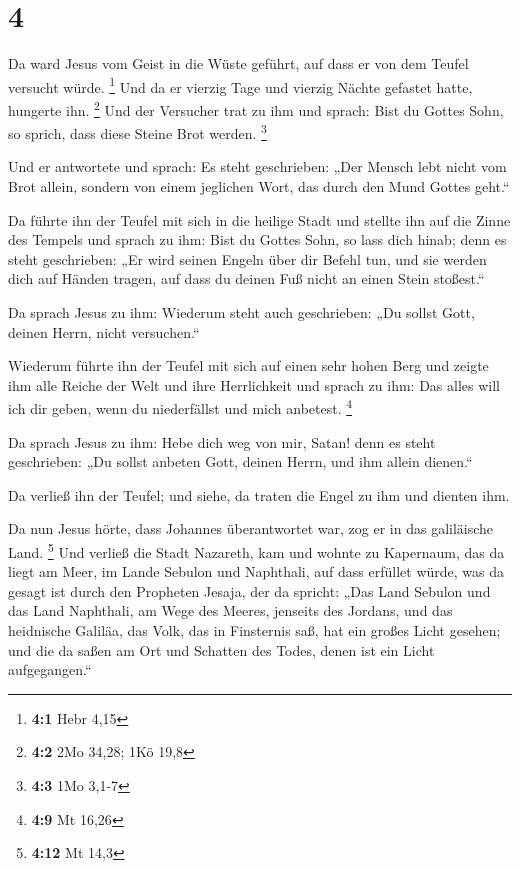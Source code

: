\hypertarget{section-2}{%
\section{4}\label{section-2}}

 Da ward Jesus vom Geist in die Wüste geführt, auf dass er
von dem Teufel versucht würde. \footnote{\textbf{4:1} Hebr 4,15}
 Und da er vierzig Tage und vierzig Nächte gefastet hatte,
hungerte ihn. \footnote{\textbf{4:2} 2Mo 34,28; 1Kö 19,8} 
Und der Versucher trat zu ihm und sprach: Bist du Gottes Sohn, so
sprich, dass diese Steine Brot werden. \footnote{\textbf{4:3} 1Mo 3,1-7}

 Und er antwortete und sprach: Es steht geschrieben: „Der
Mensch lebt nicht vom Brot allein, sondern von einem jeglichen Wort, das
durch den Mund Gottes geht.``

 Da führte ihn der Teufel mit sich in die heilige Stadt und
stellte ihn auf die Zinne des Tempels  und sprach zu ihm:
Bist du Gottes Sohn, so lass dich hinab; denn es steht geschrieben: „Er
wird seinen Engeln über dir Befehl tun, und sie werden dich auf Händen
tragen, auf dass du deinen Fuß nicht an einen Stein stoßest.``

 Da sprach Jesus zu ihm: Wiederum steht auch geschrieben:
„Du sollst Gott, deinen Herrn, nicht versuchen.``

 Wiederum führte ihn der Teufel mit sich auf einen sehr
hohen Berg und zeigte ihm alle Reiche der Welt und ihre Herrlichkeit
 und sprach zu ihm: Das alles will ich dir geben, wenn du
niederfällst und mich anbetest. \footnote{\textbf{4:9} Mt 16,26}

 Da sprach Jesus zu ihm: Hebe dich weg von mir, Satan! denn
es steht geschrieben: „Du sollst anbeten Gott, deinen Herrn, und ihm
allein dienen.``

 Da verließ ihn der Teufel; und siehe, da traten die Engel
zu ihm und dienten ihm.

 Da nun Jesus hörte, dass Johannes überantwortet war, zog
er in das galiläische Land. \footnote{\textbf{4:12} Mt 14,3}
 Und verließ die Stadt Nazareth, kam und wohnte zu
Kapernaum, das da liegt am Meer, im Lande Sebulon und Naphthali,
 auf dass erfüllet würde, was da gesagt ist durch den
Propheten Jesaja, der da spricht:  „Das Land Sebulon und
das Land Naphthali, am Wege des Meeres, jenseits des Jordans, und das
heidnische Galiläa,  das Volk, das in Finsternis saß, hat
ein großes Licht gesehen; und die da saßen am Ort und Schatten des
Todes, denen ist ein Licht aufgegangen.``

